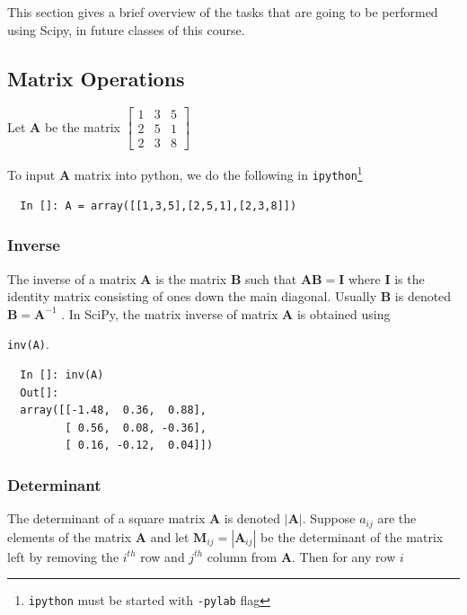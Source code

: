 \documentclass{article}
\begin{document}
This section gives a brief overview of the tasks that are going to be
performed using Scipy, in future classes of this course.

\subsection{Matrix Operations}

Let $\mathbf{A}$ be the matrix 
\(
\begin{bmatrix}
1 &3 &5\\
2 &5 &1\\
2 &3 &8
\end{bmatrix}
\) 

To input $\mathbf{A}$ matrix into python, we do the following in
\texttt{ipython}\footnote{\texttt{ipython} must be started with
  \texttt{-pylab} flag}\\

\begin{lstlisting}
  In []: A = array([[1,3,5],[2,5,1],[2,3,8]])
\end{lstlisting}

\subsubsection{Inverse}

The inverse of a matrix $\mathbf{A}$ is the matrix $\mathbf{B}$ such
that $\mathbf{A}\mathbf{B} = \mathbf{I}$ where $\mathbf{I}$ is the
identity matrix consisting of ones down the main diagonal. Usually
$\mathbf{B}$ is denoted $\mathbf{B} = \mathbf{A}^{-1}$ . In SciPy, the
matrix inverse of matrix $\mathbf{A}$ is obtained using

\lstinline+inv(A)+.
\begin{lstlisting}
  In []: inv(A)
  Out[]: 
  array([[-1.48,  0.36,  0.88],
         [ 0.56,  0.08, -0.36],
         [ 0.16, -0.12,  0.04]])
\end{lstlisting}

\subsubsection{Determinant}

The determinant of a square matrix $\mathbf{A}$ is denoted
$\left|\mathbf{A}\right|$. Suppose $a_{ij}$ are the elements of the
matrix $\mathbf{A}$ and let
$\mathbf{M}_{ij}=\left|\mathbf{A}_{ij}\right|$ be the determinant of
the matrix left by removing the $i^{th}$ row and $j^{th}$ column from
$\mathbf{A}$. Then for any row $i$
\end{document}
